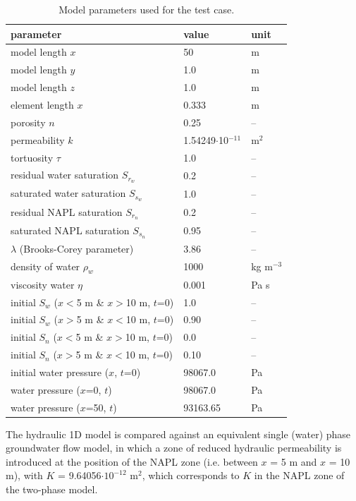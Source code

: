 \begin{table}[htbp]
\caption{Model parameters used for the test case. }
\centering
\begin{tabular}{|l|l|l|}
\hline
parameter & value & unit \\
\hline
model length $x$ &	50	& m  \\			
\hline
model length $y$ &	1.0	& m  \\		
\hline
model length $z$ &	1.0	& m  \\		
\hline
element length $x$ &	0.333	& m  \\		
\hline
porosity $n$  & 0.25 &  --  \\			
\hline
permeability $k$  & 1.54249$\cdot$10$^{-11}$ &  m$^2$  \\			
\hline
tortuosity $\tau$ & 1.0  & -- \\
\hline
residual water saturation $S_{r_w}$ & 0.2 & -- \\
\hline
saturated water saturation $S_{s_w}$ & 1.0 & -- \\
\hline
residual NAPL saturation $S_{r_n}$ & 0.2 & -- \\
\hline
saturated NAPL saturation $S_{s_n}$ & 0.95 & -- \\
\hline
$\lambda$ (Brooks-Corey parameter) & 3.86 & -- \\
\hline
density of water $\rho_w$ & 1000 & kg  m$^{-3}$ \\
\hline
viscosity water $\eta$ & 0.001 & Pa s \\
\hline
initial $S_w$ ($x<$5 m \& $x>$10 m, $t$=0)  & 1.0 & -- \\
\hline
initial $S_w$ ($x>$5 m \& $x<$10 m, $t$=0)  & 0.90 & -- \\
\hline
initial $S_n$ ($x<$5 m \& $x>$10 m, $t$=0)  & 0.0 & -- \\
\hline
initial $S_n$ ($x>$5 m \& $x<$10 m, $t$=0)  & 0.10 & -- \\
\hline
initial water pressure ($x$, $t$=0) & 98067.0  & Pa \\
\hline
water pressure ($x$=0, $t$) &  98067.0 & Pa \\
\hline
water pressure ($x$=50, $t$) & 93163.65 & Pa \\
\hline
\end{tabular}
\label{l_tab_benchmark_1d_NAPLdiss_hydr}
\end{table}

The hydraulic 1D model is compared against an equivalent single (water) phase groundwater flow model, in which a zone of reduced hydraulic permeability is introduced at the position of the NAPL zone (i.e. between $x$ = 5 m and $x$ = 10 m), with $K$ = 9.64056$\cdot10^{-12}$ m$^2$, which corresponds to $K$ in the NAPL zone of the two-phase model.

